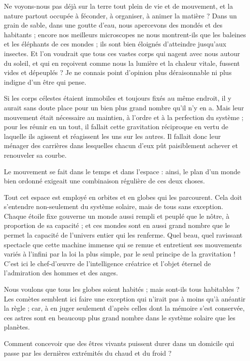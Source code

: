 \documentclass[a4paper, 11pt, oneside]{article}
\begin{document}
Ne voyons-nous pas déjà sur la terre tout plein de vie et de mouvement, et la nature partout occupée à féconder, à organiser, à animer la matière ? Dans un grain de sable, dans une goutte d'eau, nous apercevons des mondés et des habitants ; encore nos meilleurs microscopes ne nous montrent-ils que les baleines et les éléphants de ces mondes ; ils sont bien éloignés d'atteindre jusqu'aux insectes. Et l'on voudrait que tous ces vastes corps qui nagent avec nous autour du soleil, et qui en reçoivent comme nous la lumière et la chaleur vitale, fussent vides et dépeuplés ? Je ne connais point d'opinion plus déraisonnable ni plus indigne d'un être qui pense.

Si les corps célestes étaient immobiles et toujours fixés au même endroit, il y aurait sans doute place pour un bien plus grand nombre qu'il n'y en a. Mais leur mouvement était nécessaire au maintien, à l'ordre et à la perfection du système ; pour les réunir en un tout, il fallait cette gravitation réciproque en vertu de laquelle ils agissent et réagissent les uns sur les autres. Il fallait donc leur ménager des carrières dans lesquelles chacun d'eux pût paisiblement achever et renouveler sa courbe.

Le mouvement se fait dans le temps et dans l'espace : ainsi, le plan d'un monde bien ordonné exigeait une combinaison régulière de ces deux choses.

Tout cet espace est employé en orbites et en globes qui les parcourent. Cela doit s'entendre non-seulement du système solaire, mais de tous sans exception. Chaque étoile fixe gouverne un monde aussi rempli et peuplé que le nôtre, à proportion de sa capacité ; et ces mondes sont en aussi grand nombre que le permet la capacité de l'univers entier qui les renferme. Quel beau, quel ravissant spectacle que cette machine immense qui se remue et entretient ses mouvements variés à l'infini par la loi la plus simple, par le seul principe de la gravitation ! C'est ici le chef-d'œuvre de l'intelligence créatrice et l'objet éternel de l'admiration des hommes et des anges.

Nous voulons que tous les globes soient habités ; mais sont-ils tous habitables ? Les comètes semblent ici faire une exception qui n'irait pas à moins qu'à anéantir la règle ; car, à en juger seulement d'après celles dont la mémoire s'est conservée, ces astres sont en beaucoup plus grand nombre dans le système solaire que les planètes.

Comment concevoir que des êtres vivants puissent durer dans un domicile qui passe par les dernières extrémités du chaud et du froid ?
\end{document}
